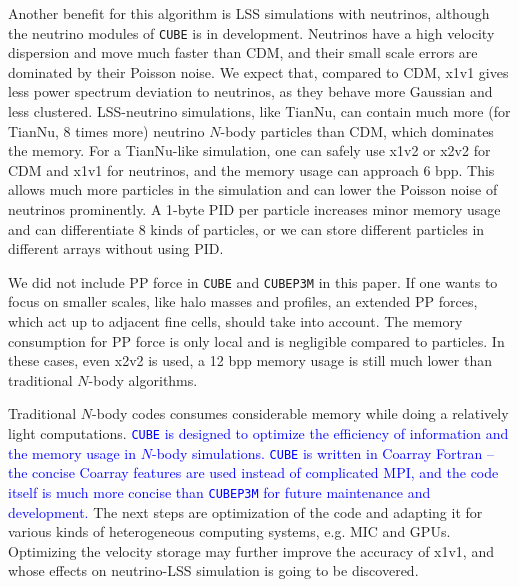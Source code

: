 \documentclass[10pt,twocolumn,preprint]{emulateapj}
\newcommand{\tcb}{\textcolor{blue}}
\begin{document}
Another benefit for this algorithm is LSS simulations with neutrinos, although the neutrino modules of {\tt CUBE} is in development. Neutrinos have a high velocity dispersion and move much faster than CDM, and their small scale errors are dominated by their Poisson noise. We expect that, compared to CDM, x1v1 gives less power spectrum deviation to neutrinos, as they behave more Gaussian and less clustered. LSS-neutrino simulations, like TianNu, can contain much more (for TianNu, 8 times more) neutrino $N$-body particles than CDM, which dominates the memory. For a TianNu-like simulation, one can safely use x1v2 or x2v2 for CDM and x1v1 for neutrinos, and the memory usage can approach 6 bpp. This allows much more particles in the simulation and can lower the Poisson noise of neutrinos prominently. A 1-byte PID per particle increases minor memory usage and can differentiate 8 kinds of particles, or we can store different particles in different arrays without using PID.

We did not include PP force in {\tt CUBE} and {\tt CUBEP3M} in this paper. If one wants to focus on smaller scales, like halo masses and profiles, an extended PP forces, which act up to adjacent fine cells, should take into account. The memory consumption for PP force is only local and is negligible compared to particles. In these cases, even x2v2 is used, a 12 bpp memory usage is still much lower than traditional $N$-body algorithms.

Traditional $N$-body codes consumes considerable memory while doing a relatively light computations. \tcb{{\tt CUBE} is designed to optimize the efficiency of information and the memory usage in $N$-body simulations. {\tt CUBE} is written in Coarray Fortran -- the concise Coarray features are used instead of complicated MPI, and the code itself is much more concise than {\tt CUBEP3M} for future maintenance and development.} The next steps are optimization of the code and adapting it for various kinds of heterogeneous computing systems, e.g. MIC and GPUs. Optimizing the velocity storage may further improve the accuracy of x1v1, and whose effects on neutrino-LSS simulation is going to be discovered.








\acknowledgements



\end{document}

